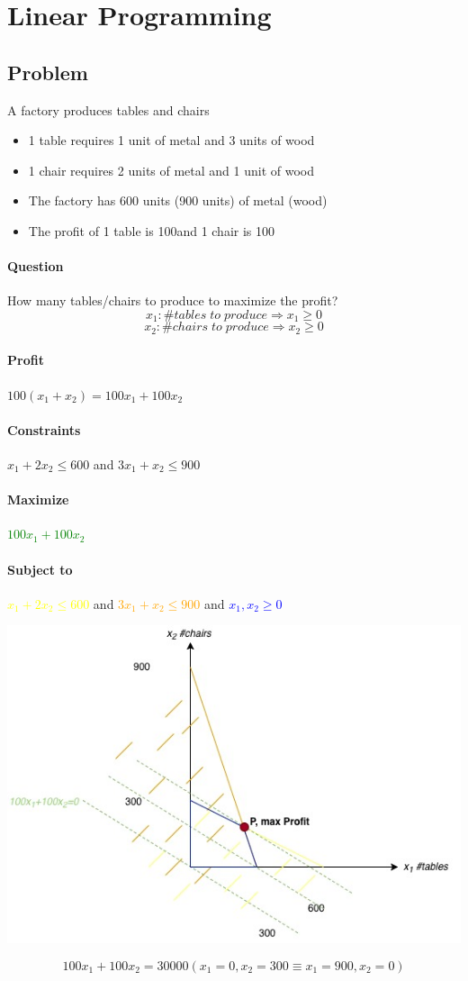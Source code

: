 \section{Linear Programming}
\subsection{Problem}
A factory produces tables and chairs
\begin{itemize}
	\item 1 table requires 1 unit of metal and 3 units of wood
	\item 1 chair requires 2 units of metal and 1 unit of wood
	\item The factory has 600 units (900 units) of metal (wood)
	\item The profit of 1 table is 100\EUR and 1 chair is 100\EUR
\end{itemize}
\paragraph{Question} How many tables/chairs to produce to maximize the profit?
$$x_1: \#tables \; to \; produce \Rightarrow x_1 \geq 0$$
$$x_2: \#chairs \; to \; produce \Rightarrow x_2 \geq 0$$
\paragraph{Profit} $100(x_1+x_2) = 100 x_1 + 100 x_2$
\paragraph{Constraints} $x_1 + 2x_2 \leq 600$ and $3x_1+x_2 \leq 900$
\paragraph{Maximize}  \textcolor{green}{$100x_1+100x_2$} 
\paragraph{Subject to} \textcolor{yellow}{$x_1 + 2x_2 \leq 600$} and \textcolor{orange}{$3x_1+x_2 \leq 900$} and \textcolor{blue}{$x_1,x_2 \geq 0$} \\
\begin{center}
	\includegraphics[scale=0.75]{img/dia1}
\end{center}
$$100x_1+100x_2 = 30000 (x_1=0,x_2 = 300 \equiv x_1 = 900, x_2=0)$$
